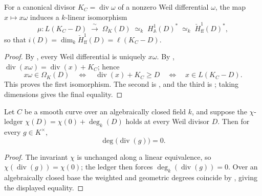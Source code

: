 \begin{theorem}
[Serre duality: \(i(D) = \ell(K_C - D)\)]
  \label{thm:adelic_serreDuality}
  \notready
  For a canonical divisor \(K_C = \operatorname{div}\omega\) of a nonzero
  Weil differential \(\omega\), the map \(x \mapsto x\omega\) induces a
  \(k\)-linear isomorphism
  \[
    \mu \colon L(K_C - D) \;\xrightarrow{\ \sim\ }\; \Omega_K(D)
      \;\simeq_k\; H^1_{\mathbb A}(D)^*
      \;\simeq_k\;\check H^1_{\mathrm{ff}}(D)^*,
  \]
  so that \(i(D)=\dim_k\check H^1_{\mathrm{ff}}(D)=\ell(K_C-D)\).
\end{theorem}
\begin{proof}
  By , every Weil
  differential is uniquely \(x\omega\).  By
  ,
  \(\operatorname{div}(x\omega)=\operatorname{div}(x)+K_C\); hence
  \[
    x\omega\in\Omega_K(D)
      \quad\Longleftrightarrow\quad
    \operatorname{div}(x)+K_C\ge D
      \quad\Longleftrightarrow\quad x\in L(K_C-D).
  \]
  This proves the first isomorphism.  The second is
  , and the third is
  ; taking dimensions gives the final
  equality.
\end{proof}

\begin{theorem}
  \label{thm:adelic_principal_geometric_degree_zero}
  \leanok
  Let \(C\) be a smooth curve over an algebraically closed field \(k\), and
  suppose the \(\chi\)-ledger
  \(\chi(D)=\chi(0)+\deg_k(D)\) holds at every Weil divisor \(D\). Then for
  every \(g\in K^\times\),
  \[
    \deg\bigl(\operatorname{div}(g)\bigr)=0 .
  \]
\end{theorem}
\begin{proof}
  \leanok
  The invariant \(\chi\) is unchanged along a linear equivalence, so
  \(\chi(\operatorname{div}(g))=\chi(0)\); the ledger then forces
  \(\deg_k(\operatorname{div}(g))=0\). Over an algebraically closed base the
  weighted and geometric degrees coincide by
  , giving the displayed equality.
\end{proof}


